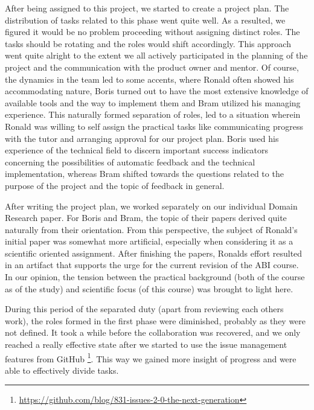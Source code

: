 After being assigned to this project, we started to create a project plan.
The distribution of tasks related to this phase went quite well. As a resulted,
we figured it would be no problem proceeding without assigning distinct
roles. The tasks should be rotating and the roles would shift accordingly.
This approach went quite alright to the extent we all actively participated in
the planning of the project and the communication with the product owner and 
mentor. Of course, the dynamics in the team led to some accents, where Ronald
often showed his accommodating nature, Boris turned out to have the most extensive
knowledge of available tools and the way to implement them and Bram utilized
his managing experience. This naturally formed separation of roles, led to a
situation wherein Ronald was willing to self assign the practical tasks like 
communicating progress with the tutor and arranging approval for our project 
plan. Boris used his experience of the technical field
to discern important success indicators concerning the possibilities of 
automatic feedback and the technical implementation,
whereas Bram shifted towards the questions related to the purpose of the project
and the topic of feedback in general. 

After writing the project plan, we worked separately on our individual Domain
Research paper. For Boris and Bram, the topic of their papers derived quite 
naturally from their orientation. From this perspective, the subject
of Ronald's initial paper was somewhat more artificial, especially
when considering it as a scientific oriented assignment. After finishing the 
papers, Ronalds effort resulted in an artifact that supports the urge for the
current revision of the ABI course. In our opinion, the tension
between the practical background (both of the course as of the study) and 
scientific focus (of this course) was brought to light here. 

During this period of the separated duty (apart from reviewing each others 
work), the roles formed in the first phase were diminished, probably as they 
were not defined. It took a while before the 
collaboration was recovered, and we only reached a really effective state after
we started to use the issue management features from GitHub
\footnote{\url{https://github.com/blog/831-issues-2-0-the-next-generation}}.
This way we gained more insight of progress and were able to effectively divide
tasks. 

